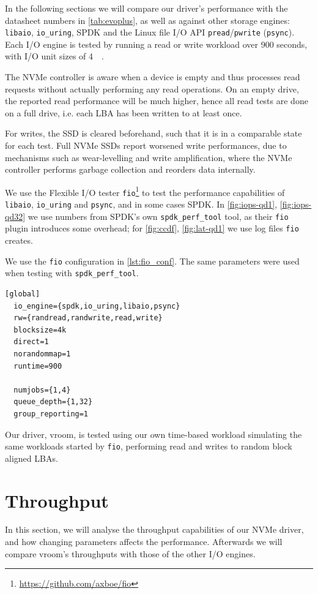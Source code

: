 In the following sections we will compare our driver's performance with the datasheet numbers in \autoref{tab:evoplus}, as well as against other storage engines: \texttt{libaio}, \texttt{io\_uring}, SPDK and the Linux file I/O API \texttt{pread}/\texttt{pwrite} (\texttt{psync}). Each I/O engine is tested by running a read or write workload over 900 seconds, with I/O unit sizes of \qty{4}{\kibi\byte}.

The NVMe controller is aware when a device is empty and thus processes read requests without actually performing any read operations. On an empty drive, the reported read performance will be much higher, hence all read tests are done on a full drive, i.e. each LBA has been written to at least once.

For writes, the SSD is cleared beforehand, such that it is in a comparable state for each test. Full NVMe SSDs report worsened write performances, due to mechanisms such as wear-levelling and write amplification, where the NVMe controller performs garbage collection and reorders data internally.


We use the Flexible I/O tester \texttt{fio}\footnote{\url{https://github.com/axboe/fio}} to test the performance capabilities of \texttt{libaio}, \texttt{io\_uring} and \texttt{psync}, and in some cases SPDK. In \autoref{fig:iops-qd1}, \autoref{fig:iops-qd32} we use numbers from SPDK's own \texttt{spdk\_perf\_tool} tool, as their \texttt{fio} plugin introduces some overhead; for \autoref{fig:ccdf}, \autoref{fig:lat-qd1} we use log files \texttt{fio} creates.

We use the \texttt{fio} configuration in \autoref{lst:fio_conf}. The same parameters were used when testing with \texttt{spdk\_perf\_tool}.

\begin{lstlisting}[float, label=lst:fio_conf, caption=\texttt{fio} configuration]
  [global]
  io_engine={spdk,io_uring,libaio,psync}
  rw={randread,randwrite,read,write}
  blocksize=4k
  direct=1
  norandommap=1
  runtime=900

  numjobs={1,4}
  queue_depth={1,32}
  group_reporting=1
\end{lstlisting}

Our driver, vroom, is tested using our own time-based workload simulating the same workloads started by \texttt{fio}, performing read and writes to random block aligned LBAs.

\section{Throughput}
In this section, we will analyse the throughput capabilities of our NVMe driver, and how changing parameters affects the performance. Afterwards we will compare vroom's throughputs with those of the other I/O engines.


